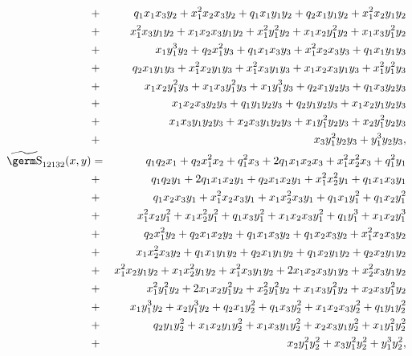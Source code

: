 {{\begin{eqnarray*}
 &+ & q_1 x_1 x_3 y_2 + 
   x_1^2 x_2 x_3 y_2 + q_1 x_1 y_1 y_2 + q_2 x_1 y_1 y_2 + x_1^2 x_2 y_1 y_2\\ 
 &+ & x_1^2 x_3 y_1 y_2 + x_1 x_2 x_3 y_1 y_2 + x_1^2 y_1^2 y_2 + 
x_1 x_2 y_1^2 y_2 +  x_1 x_3 y_1^2 y_2 \\ 
 &+ & x_1 y_1^3 y_2 + q_2 x_1^2 y_3 + 
q_1 x_1 x_3 y_3 + x_1^2x_2 x_3 y_3 + 
   q_1 x_1 y_1 y_3 \\ 
 &+ & q_2 x_1 y_1 y_3 + 
x_1^2 x_2 y_1 y_3 + x_1^2 x_3 y_1 y_3 + 
   x_1 x_2 x_3 y_1 y_3 + x_1^2 y_1^2 y_3 \\ 
 &+ & x_1 x_2 y_1^2 y_3 + x_1 x_3 y_1^2 y_3 + 
 x_1 y_1^3 y_3 + q_2 x_1 y_2 y_3 + q_1 x_3 y_2 y_3 \\ 
 &+ & x_1 x_2 x_3 y_2 y_3 + q_1 y_1 y_2 y_3 + 
 q_2 y_1 y_2 y_3 + x_1 x_2 y_1 y_2 y_3 \\
 &+ & x_1 x_3 y_1 y_2 y_3 + x_2 x_3 y_1 y_2 y_3 + 
 x_1 y_1^2 y_2 y_3 + x_2 y_1^2 y_2 y_3  \\
&+& x_3 y_1^2 y_2 y_3 + y_1^3 y_2 y_3,  \\ 
\wt{\s}_{12132}(x,y) & = & q_1 q_2 x_1 + q_2 x_1^2 x_2 + 
q_1^2 x_3 + 2 q_1 x_1 x_2 x_3 + x_1^2 x_2^2 x_3 + 
q_1^2 y_1\\ 
 &+ &  q_1 q_2 y_1 + 2 q_1 x_1 x_2 y_1 + 
q_2 x_1 x_2 y_1 + x_1^2 x_2^2 y_1 + 
 q_1 x_1 x_3 y_1\\ 
 &+ & q_1 x_2 x_3 y_1 + 
x_1^2 x_2 x_3 y_1 + x_1 x_2^2 x_3 y_1 + q_1 x_1 y_1^2 + 
 q_1 x_2 y_1^2\\ 
 &+ & x_1^2 x_2 y_1^2 + 
x_1 x_2^2 y_1^2 + q_1 x_3 y_1^2 + x_1 x_2 x_3 y_1^2 + 
   q_1 y_1^3 + x_1 x_2 y_1^3\\ 
 &+ & q_2 x_1^2 y_2 + q_2 x_1 x_2 y_2 + q_1 x_1 x_3 y_2 + 
   q_1 x_2 x_3 y_2 + x_1^2 x_2 x_3 y_2\\ 
 &+ & x_1 x_2^2 x_3 y_2 + q_1 x_1 y_1 y_2 + q_2 x_1 y_1 y_2 + 
   q_1 x_2 y_1 y_2 + q_2 x_2 y_1 y_2\\ 
 &+ & x_1^2 x_2 y_1 y_2 + x_1 x_2^2 y_1 y_2 + x_1^2 x_3 y_1 y_2 + 
2 x_1 x_2 x_3 y_1 y_2 + x_2^2 x_3 y_1 y_2\\ 
 &+ & x_1^2 y_1^2 y_2 + 
   2 x_1 x_2 y_1^2 y_2 + x_2^2 y_1^2 y_2 + x_1 x_3 y_1^2 y_2 + 
x_2 x_3 y_1^2 y_2\\ 
 &+ &  x_1 y_1^3 y_2 + x_2 y_1^3 y_2 + q_2 x_1 y_2^2 + q_1 x_3 y_2^2 + 
x_1 x_2 x_3 y_2^2 + q_1 y_1 y_2^2\\ 
 &+ & q_2 y_1 y_2^2 + x_1 x_2 y_1 y_2^2 + x_1 x_3 y_1 y_2^2 + 
x_2 x_3 y_1 y_2^2 + 
   x_1 y_1^2 y_2^2\\ 
 &+ & x_2 y_1^2 y_2^2 + x_3 y_1^2 y_2^2 + y_1^3 y_2^2, \\ 

\end{eqnarray*}}}
